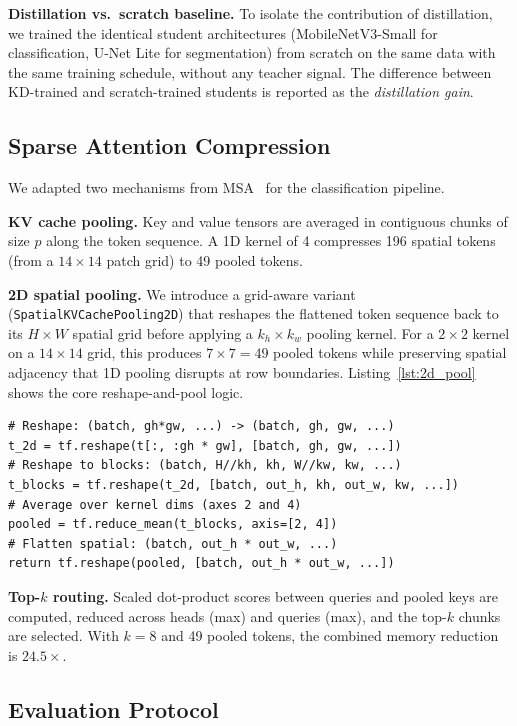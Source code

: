 \documentclass[10pt,twocolumn]{article}
\begin{document}
\textbf{Distillation vs.\ scratch baseline.} To isolate the contribution of distillation, we trained the identical student architectures (MobileNetV3-Small for classification, U-Net Lite for segmentation) from scratch on the same data with the same training schedule, without any teacher signal. The difference between KD-trained and scratch-trained students is reported as the \emph{distillation gain}.

\subsection{Sparse Attention Compression}

We adapted two mechanisms from MSA~\citep{chen2026msa} for the classification pipeline.

\textbf{KV cache pooling.} Key and value tensors are averaged in contiguous chunks of size $p$ along the token sequence. A 1D kernel of 4 compresses 196 spatial tokens (from a $14{\times}14$ patch grid) to 49 pooled tokens.

\textbf{2D spatial pooling.} We introduce a grid-aware variant (\texttt{SpatialKVCachePooling2D}) that reshapes the flattened token sequence back to its $H{\times}W$ spatial grid before applying a $k_h{\times}k_w$ pooling kernel. For a $2{\times}2$ kernel on a $14{\times}14$ grid, this produces $7{\times}7{=}49$ pooled tokens while preserving spatial adjacency that 1D pooling disrupts at row boundaries. Listing~\ref{lst:2d_pool} shows the core reshape-and-pool logic.

\begin{lstlisting}[caption={2D spatial pooling kernel (\texttt{compression/sparse\_attention.py}).},label=lst:2d_pool]
# Reshape: (batch, gh*gw, ...) -> (batch, gh, gw, ...)
t_2d = tf.reshape(t[:, :gh * gw], [batch, gh, gw, ...])
# Reshape to blocks: (batch, H//kh, kh, W//kw, kw, ...)
t_blocks = tf.reshape(t_2d, [batch, out_h, kh, out_w, kw, ...])
# Average over kernel dims (axes 2 and 4)
pooled = tf.reduce_mean(t_blocks, axis=[2, 4])
# Flatten spatial: (batch, out_h * out_w, ...)
return tf.reshape(pooled, [batch, out_h * out_w, ...])
\end{lstlisting}

\textbf{Top-$k$ routing.} Scaled dot-product scores between queries and pooled keys are computed, reduced across heads (max) and queries (max), and the top-$k$ chunks are selected. With $k{=}8$ and 49 pooled tokens, the combined memory reduction is $24.5{\times}$.

\subsection{Evaluation Protocol}
\end{document}

